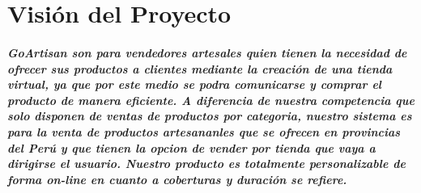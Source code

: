 \chapter{Visión del Proyecto}

\paragraph{GoArtisan son para vendedores artesales quien tienen la necesidad de ofrecer sus productos a clientes mediante la creación de una tienda virtual, ya que por este medio se podra comunicarse y comprar el producto de manera eficiente. A diferencia de nuestra competencia que solo disponen de ventas de productos por categoria, nuestro sistema es para la venta de productos artesananles que se ofrecen en provincias del Perú y que tienen la opcion de vender por tienda que vaya a dirigirse el usuario. Nuestro producto es totalmente personalizable de forma on-line en cuanto a coberturas y duración se refiere.}